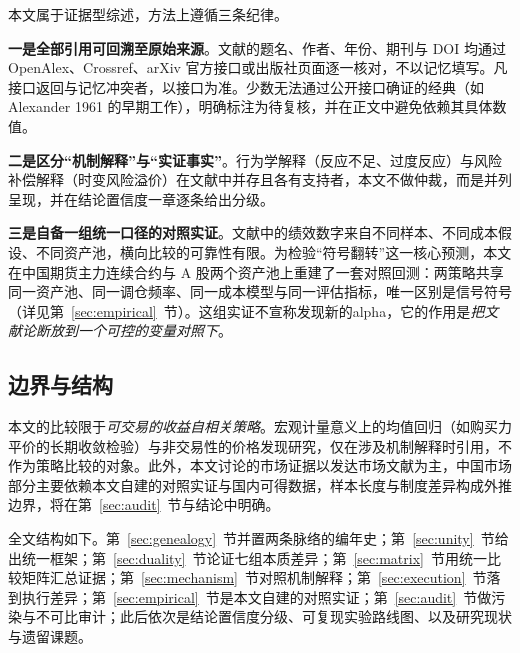 本文属于证据型综述，方法上遵循三条纪律。

\textbf{一是全部引用可回溯至原始来源}。文献的题名、作者、年份、期刊与 DOI 均通过 OpenAlex、Crossref、arXiv 官方接口或出版社页面逐一核对，不以记忆填写。凡接口返回与记忆冲突者，以接口为准。少数无法通过公开接口确证的经典（如 Alexander 1961 的早期工作），明确标注为待复核，并在正文中避免依赖其具体数值。

\textbf{二是区分“机制解释”与“实证事实”}。行为学解释（反应不足、过度反应）与风险补偿解释（时变风险溢价）在文献中并存且各有支持者，本文不做仲裁，而是并列呈现，并在结论置信度一章逐条给出分级\cite{cochrane2011,bsv1998,dhs1998,hongstein1999}。

\textbf{三是自备一组统一口径的对照实证}。文献中的绩效数字来自不同样本、不同成本假设、不同资产池，横向比较的可靠性有限。为检验“符号翻转”这一核心预测，本文在中国期货主力连续合约与 A 股两个资产池上重建了一套对照回测：两策略共享同一资产池、同一调仓频率、同一成本模型与同一评估指标，唯一区别是信号符号（详见第~\ref{sec:empirical}~节）。这组实证不宣称发现新的alpha，它的作用是\emph{把文献论断放到一个可控的变量对照下}。

\subsection{边界与结构}

本文的比较限于\emph{可交易的收益自相关策略}。宏观计量意义上的均值回归（如购买力平价的长期收敛检验）与非交易性的价格发现研究，仅在涉及机制解释时引用，不作为策略比较的对象。此外，本文讨论的市场证据以发达市场文献为主，中国市场部分主要依赖本文自建的对照实证与国内可得数据，样本长度与制度差异构成外推边界，将在第~\ref{sec:audit}~节与结论中明确。

全文结构如下。第~\ref{sec:genealogy}~节并置两条脉络的编年史；第~\ref{sec:unity}~节给出统一框架；第~\ref{sec:duality}~节论证七组本质差异；第~\ref{sec:matrix}~节用统一比较矩阵汇总证据；第~\ref{sec:mechanism}~节对照机制解释；第~\ref{sec:execution}~节落到执行差异；第~\ref{sec:empirical}~节是本文自建的对照实证；第~\ref{sec:audit}~节做污染与不可比审计；此后依次是结论置信度分级、可复现实验路线图、以及研究现状与遗留课题。
